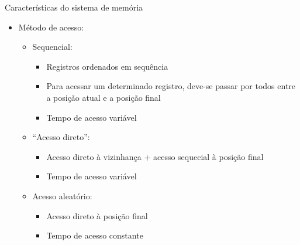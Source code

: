 \begin{slide}{Características do sistema de memória}
	\begin{itemize}
		\item Método de acesso:
			\begin{itemize}
				\item Sequencial:
					\begin{itemize}
						\item Registros ordenados em sequência
						\item Para acessar um determinado registro, deve-se passar por todos entre a posição atual e a posição final
						\item Tempo de acesso variável
					\end{itemize}
				\item ``Acesso direto'':  
					\begin{itemize}
						\item Acesso direto à vizinhança + acesso sequecial à posição final
						\item Tempo de acesso variável
					\end{itemize}
				\item Acesso aleatório:
					\begin{itemize}
						\item Acesso direto à posição final
						\item Tempo de acesso constante
					\end{itemize}
			\end{itemize}
	\end{itemize}
\end{slide}

